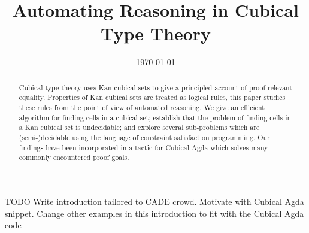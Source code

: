 \documentclass{llncs}
\title{Automating Reasoning in Cubical Type Theory}
\author{}
\institute{}
\date{\today}
\newcommand{\todo}[1]{
  \begin{tcolorbox}
    TODO {#1} 
  \end{tcolorbox}
}
\begin{document}
\maketitle

\begin{abstract}
  Cubical type theory uses Kan cubical sets to give a principled account of
  proof-relevant equality. Properties of Kan cubical sets are treated as logical
  rules, this paper studies these rules from the point of view of automated
  reasoning. We give an efficient algorithm for finding cells in a cubical set;
  establish that the problem of finding cells in a Kan cubical set is
  undecidable; and explore several sub-problems which are (semi-)decidable using
  the language of constraint satisfaction programming. Our findings have been
  incorporated in a tactic for Cubical Agda which solves many commonly
  encountered proof goals.
\end{abstract}


\todo{Write introduction tailored to CADE crowd. Motivate with Cubical Agda
  snippet. Change other examples in this introduction to fit with the Cubical Agda code}





\end{document}
